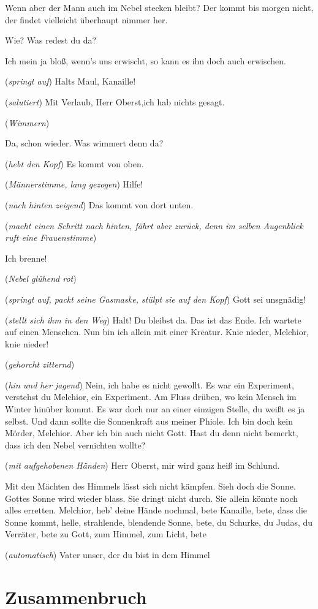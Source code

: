 \documentclass[
	final,
	a4paper,
	ngerman,
	mpinclude = true, %
	twoside = true,
	open = right,
	cleardoublepage = plain,
	DIV = 13,
	BCOR = 1cm,
	titlepage = firstiscover,
	]{scrbook}
\newcommand{\scene}{\setcounter{subscene}{1}\section}
\newcommand{\direction}[1]{(\textit{#1})}
\newcounter{subscene}
\newcommand{\thecharacter}[1]{\textup{\textsc{#1}}\xspace}
\newcommand{\theBrix}{\thecharacter{Oberst~Brix}}
\newcommand{\theMelchior}{\thecharacter{Melchior}}
\newcommand{\character}[1]{\item[#1]}
\newcommand{\Brix}{\character{\theBrix}}
\newcommand{\Melchior}{\character{\theMelchior}}
\newcommand{\Stimme}{\character{\emph{Stimme}}}
\begin{document}
\begin{play}
\Melchior
Wenn aber der Mann auch im Nebel stecken bleibt? Der kommt bis morgen nicht, der findet vielleicht überhaupt nimmer her.

\Brix
Wie? Was redest du da?

\Melchior
Ich mein ja bloß, wenn's uns erwischt, so kann es ihn doch auch erwischen.

\Brix
\direction{springt auf} Halts Maul, Kanaille!

\Melchior
\direction{salutiert} Mit Verlaub, Herr Oberst,ich hab nichts gesagt.

\direction{Wimmern}

\Melchior
Da, schon wieder. Was wimmert denn da?

\Brix
\direction{hebt den Kopf} Es kommt von oben.

\Stimme
\direction{Männerstimme, lang gezogen} Hilfe!

\Melchior
\direction{nach hinten zeigend} Das kommt von dort unten.

\Brix
\direction{macht einen Schritt nach hinten, fährt aber zurück, denn im selben Augenblick ruft eine Frauenstimme}

\Stimme
Ich brenne!

\direction{Nebel glühend rot}

\Melchior
\direction{springt auf, packt seine Gasmaske, stülpt sie auf den Kopf} Gott sei unsgnädig!

\Brix
\direction{stellt sich ihm in den Weg} Halt! Du bleibst da. Das ist das Ende. Ich wartete auf einen Menschen. Nun bin ich allein mit einer Kreatur. Knie nieder, Melchior, knie nieder!

\Melchior
\direction{gehorcht zitternd}

\Brix
\direction{hin und her jagend} Nein, ich habe es nicht gewollt. Es war ein Experiment, verstehst du Melchior, ein Experiment. Am Fluss drüben, wo kein Mensch im Winter hinüber kommt. Es war doch nur an einer einzigen Stelle, du weißt es ja selbst. Und dann sollte die Sonnenkraft aus meiner Phiole. Ich bin doch kein Mörder, Melchior. Aber ich bin auch nicht Gott. Hast du denn nicht bemerkt, dass ich den Nebel vernichten wollte?

\Melchior
\direction{mit aufgehobenen Händen} Herr Oberst, mir wird ganz heiß im Schlund.

\Brix
Mit den Mächten des Himmels lässt sich nicht kämpfen. Sieh doch die Sonne. Gottes Sonne wird wieder blass. Sie dringt nicht durch. Sie allein könnte noch alles erretten. Melchior, heb' deine Hände nochmal, bete Kanaille, bete, dass die Sonne kommt, helle, strahlende, blendende Sonne, bete, du Schurke, du Judas, du Verräter, bete zu Gott, zum Himmel, zum Licht, bete

\Melchior
\direction{automatisch} Vater unser, der du bist in dem Himmel

\end{play}



\scene{Zusammenbruch}
\label{scene:VII}
\end{document}
